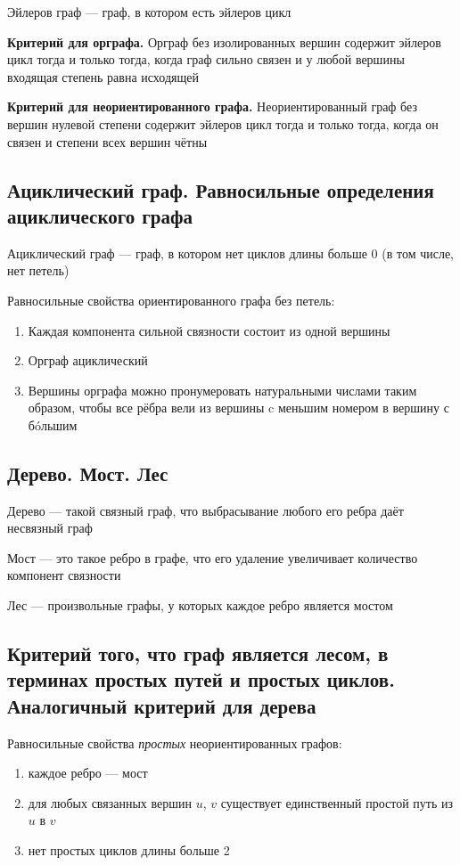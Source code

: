 \documentclass[a4paper]{article}
\begin{document}
 Эйлеров граф — граф, в котором есть эйлеров цикл 

\textbf{Критерий для орграфа.} Орграф без изолированных вершин содержит эйлеров цикл тогда и только тогда, когда граф сильно связен и у любой вершины входящая степень равна исходящей

\textbf{Критерий для неориентированного графа.} Неориентированный граф без вершин нулевой степени содержит эйлеров цикл тогда и только тогда, когда он связен и степени всех вершин чётны

\subsection{Ациклический граф. Равносильные определения ациклического графа}
 Ациклический граф — граф, в котором нет циклов длины больше 0 (в том числе, нет петель)

Равносильные свойства ориентированного графа без петель:
\begin{enumerate}
    \item Каждая компонента сильной связности состоит из одной вершины
    \item Орграф ациклический
    \item Вершины орграфа можно пронумеровать натуральными числами таким образом, чтобы все рёбра вели из вершины c меньшим номером в вершину с б\'oльшим
\end{enumerate}

\subsection{Дерево. Мост. Лес}
 Дерево — такой связный граф, что выбрасывание любого его ребра даёт несвязный граф

 Мост — это такое ребро в графе, что его удаление увеличивает количество компонент связности 

 Лес — произвольные графы, у которых каждое ребро является мостом

\subsection{Критерий того, что граф является лесом, в терминах простых путей и простых циклов. Аналогичный критерий для дерева}
Равносильные свойства \textit{простых} неориентированных графов:
\begin{enumerate}
    \item каждое ребро — мост
    \item для любых связанных вершин $u$, $v$ существует единственный простой путь из $u$ в $v$
    \item нет простых циклов длины больше 2
\end{enumerate}
\end{document}
